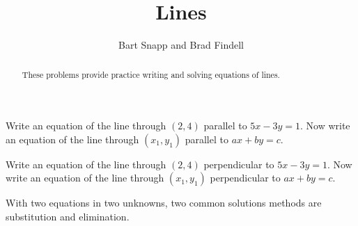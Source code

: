 \documentclass[nooutcomes]{ximera}
\title{Lines}
\author{Bart Snapp and Brad Findell}
\begin{document}
\begin{abstract}
These problems provide practice writing and solving equations of lines. 
\end{abstract}
\maketitle


\begin{problem}
Write an equation of the line through $(2,4)$ parallel to $5x-3y=1$.  
Now write an equation of the line through $(x_1,y_1)$ parallel to $ax+by=c$. 
\end{problem}

\begin{problem}
Write an equation of the line through $(2,4)$ perpendicular to $5x-3y=1$.  
Now write an equation of the line through $(x_1,y_1)$ perpendicular to $ax+by=c$. 
\end{problem}


%
%
%
%
With two equations in two unknowns, two common solutions methods are substitution and elimination.  
\end{document}
